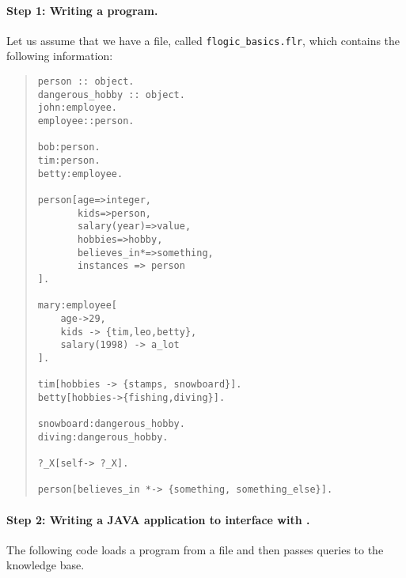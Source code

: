 \paragraph{Step 1: Writing a \FLORA program.}
  Let us assume that we have a file, called  {\tt flogic\_basics.flr},
  which contains the following information:
\begin{quote}
\begin{verbatim}
person :: object.
dangerous_hobby :: object.
john:employee.
employee::person.

bob:person.
tim:person.
betty:employee.

person[age=>integer,
       kids=>person,
       salary(year)=>value,
       hobbies=>hobby,
       believes_in*=>something,
       instances => person
].

mary:employee[
    age->29,
    kids -> {tim,leo,betty},
    salary(1998) -> a_lot
].

tim[hobbies -> {stamps, snowboard}].
betty[hobbies->{fishing,diving}].

snowboard:dangerous_hobby.
diving:dangerous_hobby.

?_X[self-> ?_X].

person[believes_in *-> {something, something_else}].
\end{verbatim}
\end{quote}

\paragraph{Step 2:  Writing a JAVA application to interface with \FLORA.}
 The following code loads a \FLORA program from a file and then passes
 queries to the knowledge base.

